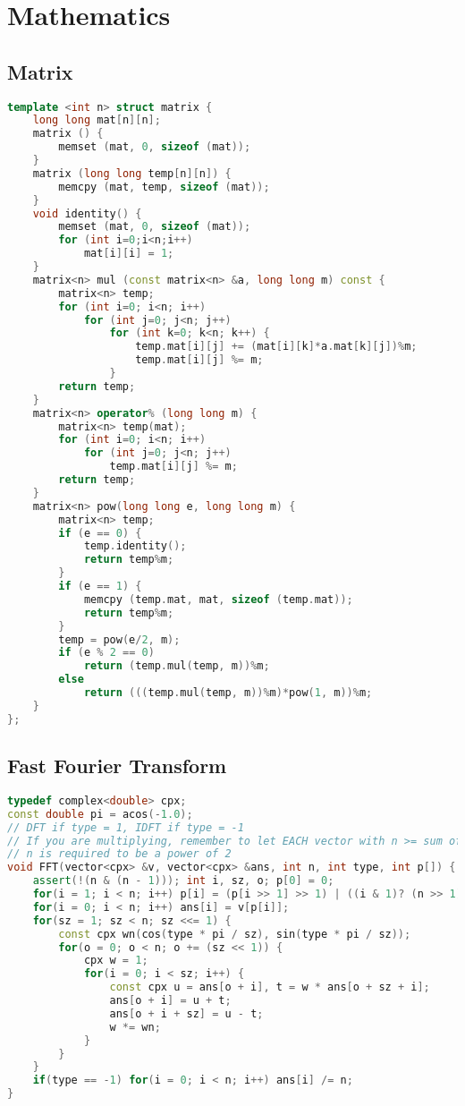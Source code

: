 \documentclass{article}
\begin{document}
\section{Mathematics}
\subsection{Matrix}
\begin{lstlisting}[language=C++]
template <int n> struct matrix {
	long long mat[n][n];
	matrix () {
		memset (mat, 0, sizeof (mat));
	}
	matrix (long long temp[n][n]) {
		memcpy (mat, temp, sizeof (mat));
	}
	void identity() {
		memset (mat, 0, sizeof (mat));
		for (int i=0;i<n;i++)
			mat[i][i] = 1;
	}
	matrix<n> mul (const matrix<n> &a, long long m) const {
		matrix<n> temp;
		for (int i=0; i<n; i++)
			for (int j=0; j<n; j++)
				for (int k=0; k<n; k++) {
					temp.mat[i][j] += (mat[i][k]*a.mat[k][j])%m;
					temp.mat[i][j] %= m;
				}
		return temp;
	}
	matrix<n> operator% (long long m) {
		matrix<n> temp(mat);
		for (int i=0; i<n; i++)
			for (int j=0; j<n; j++)
				temp.mat[i][j] %= m;
		return temp;
	}
	matrix<n> pow(long long e, long long m) {
		matrix<n> temp;
		if (e == 0) {
			temp.identity();
			return temp%m;
		}
		if (e == 1) {
			memcpy (temp.mat, mat, sizeof (temp.mat));
			return temp%m;
		}
		temp = pow(e/2, m);
		if (e % 2 == 0)
			return (temp.mul(temp, m))%m;
		else
			return (((temp.mul(temp, m))%m)*pow(1, m))%m;
	}
};
\end{lstlisting}
\subsection{Fast Fourier Transform}
\begin{lstlisting}[language=C++]
typedef complex<double> cpx;
const double pi = acos(-1.0);
// DFT if type = 1, IDFT if type = -1
// If you are multiplying, remember to let EACH vector with n >= sum of degrees of both polys
// n is required to be a power of 2
void FFT(vector<cpx> &v, vector<cpx> &ans, int n, int type, int p[]) { // p[n]
	assert(!(n & (n - 1))); int i, sz, o; p[0] = 0;
	for(i = 1; i < n; i++) p[i] = (p[i >> 1] >> 1) | ((i & 1)? (n >> 1) : 0);
	for(i = 0; i < n; i++) ans[i] = v[p[i]];
	for(sz = 1; sz < n; sz <<= 1) {
		const cpx wn(cos(type * pi / sz), sin(type * pi / sz));
		for(o = 0; o < n; o += (sz << 1)) {
			cpx w = 1;
			for(i = 0; i < sz; i++) {
				const cpx u = ans[o + i], t = w * ans[o + sz + i];
				ans[o + i] = u + t;
				ans[o + i + sz] = u - t;
				w *= wn;
			}
		}
	}
	if(type == -1) for(i = 0; i < n; i++) ans[i] /= n;
}\end{lstlisting}
\end{document}
